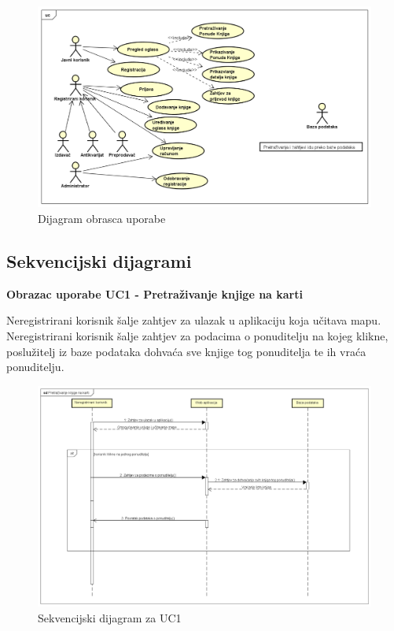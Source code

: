 	\begin{figure}[H]
	\includegraphics[scale=0.5]{slike/dijagramObrascaUporabe.png} %
	\centering
	\caption{Dijagram obrasca uporabe}
	\label{fig:Dijagram obrasca uporabe}
	\end{figure}
	
\eject	

\subsection{Sekvencijski dijagrami}

	\textbf{Obrazac uporabe UC1 - Pretraživanje knjige na karti}
	
	Neregistrirani korisnik šalje zahtjev za ulazak u aplikaciju koja učitava mapu. Neregistrirani korisnik šalje zahtjev za podacima o ponuditelju na kojeg klikne, poslužitelj iz baze podataka dohvaća sve knjige tog ponuditelja te ih vraća ponuditelju.

	\begin{figure}[H]
	\includegraphics[scale=0.4]{slike/sekvencijskiDijagramPretrazivanjeKnjigeNaKarti.png} %
	\centering
	\caption{Sekvencijski dijagram za UC1}
	\label{fig:Sekvencijski dijagam za UC1}
	\end{figure}

